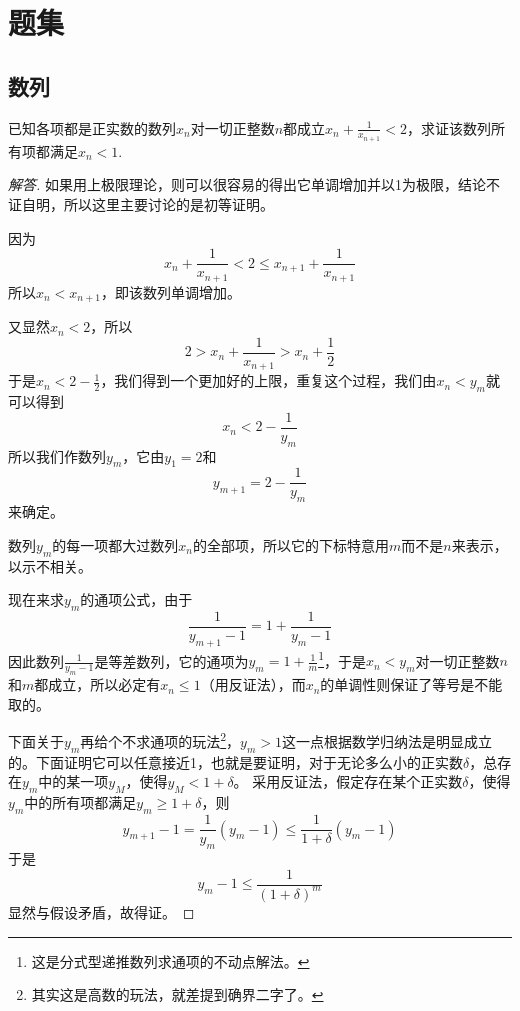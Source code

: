
\section{题集}
\label{sec:number-sequence-exercise}

\subsection{数列}
\label{sec:exercise-number-series}



\begin{exercise}
  已知各项都是正实数的数列$x_n$对一切正整数$n$都成立$x_n+\frac{1}{x_{n+1}}<2$，求证该数列所有项都满足$x_n<1$.
\end{exercise}
\begin{proof}[解答]
  如果用上极限理论，则可以很容易的得出它单调增加并以1为极限，结论不证自明，所以这里主要讨论的是初等证明。

因为
$$
x_n+\frac{1}{x_{n+1}}<2 \leqslant 
x_{n+1}+\frac{1}{x_{n+1}}
$$
所以$x_n<x_{n+1}$，即该数列单调增加。

又显然$x_n<2$，所以
$$
2>x_n+\frac{1}{x_{n+1}}>x_n+\frac{1}{2}
$$
于是$x_n<2-\frac{1}{2}$，我们得到一个更加好的上限，重复这个过程，我们由$x_n<y_m$就可以得到
$$
x_n<2-\frac{1}{y_m}
$$
所以我们作数列$y_m$，它由$y_1=2$和
$$
y_{m+1}=2-\frac{1}{y_m}
$$
来确定。

数列$y_m$的每一项都大过数列$x_n$的全部项，所以它的下标特意用$m$而不是$n$来表示，以示不相关。

现在来求$y_m$的通项公式，由于
$$
\frac{1}{y_{m+1}-1}=1+\frac{1}{y_{m}-1}
$$
因此数列$\frac{1}{y_m-1}$是等差数列，它的通项为$y_m=1+\frac{1}{m}$\footnote{这是分式型递推数列求通项的不动点解法。}，于是$x_n<y_m$对一切正整数$n$和$m$都成立，所以必定有$x_n\leqslant 1$（用反证法），而$x_n$的单调性则保证了等号是不能取的。

下面关于$y_m$再给个不求通项的玩法\footnote{其实这是高数的玩法，就差提到确界二字了。}，$y_m>1$这一点根据数学归纳法是明显成立的。下面证明它可以任意接近1，也就是要证明，对于无论多么小的正实数$\delta$，总存在$y_m$中的某一项$y_M$，使得$y_M<1+\delta$。
采用反证法，假定存在某个正实数$\delta$，使得$y_m$中的所有项都满足$y_m\geqslant 1+\delta$，则
$$
y_{m+1}-1=\frac{1}{y_m}(y_m-1)\leqslant 
\frac{1}{1+\delta}(y_m-1)
$$
于是
$$
y_m-1\leqslant \frac{1}{(1+\delta)^m}
$$
显然与假设矛盾，故得证。
\end{proof}

